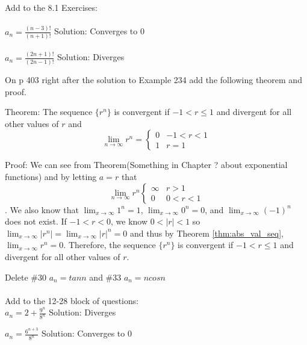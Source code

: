 \documentclass[10pt]{article}
\newcommand{\ds}{\displaystyle}
\begin{document}
Add to the 8.1 Exercises: \\ \\


$\ds {a_n}=\frac{(n-3)!}{(n+1)!}$  	    Solution:  Converges to 0 \\ \\


$\ds {a_n}=\frac{(2n+1)!}{(2n-1)!}$       Solution: Diverges



On p 403 right after the solution to Example 234 add the following theorem and proof.

Theorem:  The sequence $\{ r^n\}$ is convergent if $-1<r\leq 1$ and divergent for all other values of $r$ and $$\lim_{n\to \infty} r^n=\begin{cases} 
0&  -1<r<1\\
1& r=1
\end{cases}$$

Proof:
We can see from Theorem(Something in Chapter ? about exponential functions) and by letting $a=r$ that $$\lim_{n\to \infty} r^n 
\begin{cases}
\infty &  r>1\\
0 & 0<r<1
\end{cases}$$. We also know that $\ds  \lim_{x\to \infty} 1^n=1$, $\ds  \lim_{x\to \infty} 0^n=0$,  and $\ds  \lim_{x\to \infty} (-1)^n$ does not exist. If $-1<r<0$, we know $0<|r|<1$ so $\ds \lim_{x\to \infty} |r^n|=\lim_{x\to \infty} |r|^n=0$ and thus by Theorem \ref{thm:abs_val_seq},$\ds \lim_{x\to \infty} r^n=0$. Therefore, the sequence $\{ r^n\}$ is convergent if $-1<r\leq 1$ and divergent for all other values of $r$.


Delete \#30  $a_n=tan n$ and \#33 $a_n=n cos n$ \\ \\

Add to the 12-28 block of questions: \\

$\ds {a_n}=2+\frac{9^n}{8^n}$		Solution: Diverges

$\ds {a_n}=\frac{6^{n+3}}{8^n}$  		Solution: Converges to 0
\end{document}
